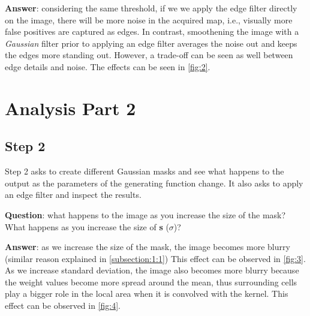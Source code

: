 \documentclass[lettersize,journal]{IEEEtran}
\begin{document}
\hfill

\noindent\textbf{Answer}: considering the same threshold, if we we apply the edge filter directly on the image, there will be more noise in the acquired map, i.e., visually more false positives are captured as edges. In contrast, smoothening the image with a \emph{Gaussian} filter prior to applying an edge filter averages the noise out and keeps the edges more standing out. However, a trade-off can be seen as well between edge details and noise. The effects can be seen in \autoref{fig:2}.

\section{Analysis Part 2}

\subsection{Step 2}\label{subsection:2:1}

\noindent Step 2 asks to create different Gaussian masks and see what happens to the output as the parameters of the generating function change. It also asks to apply an edge filter and inspect the results.

\hfill

\noindent\textbf{Question}: what happens to the image as you increase the size of the mask? What happens as you increase the size of \textbf{s} ($\sigma$)?

\hfill

\noindent\textbf{Answer}: as we increase the size of the mask, the image becomes more blurry (similar reason explained in \autoref{subsection:1:1}) This effect can be observed in \autoref{fig:3}. As we increase standard deviation, the image also becomes more blurry because the weight values become more spread around the mean, thus surrounding cells play a bigger role in the local area when it is convolved with the kernel. This effect can be observed in \autoref{fig:4}.
\end{document}

